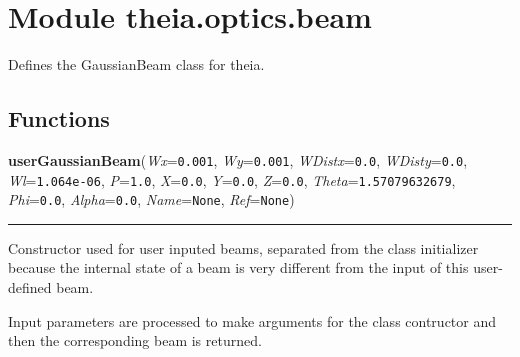 %
%
%


\section{Module theia.optics.beam}

    \label{theia:optics:beam}
Defines the GaussianBeam class for theia.



  \subsection{Functions}

    \label{theia:optics:beam:userGaussianBeam}

    \vspace{0.5ex}

\hspace{.8\funcindent}\begin{boxedminipage}{\funcwidth}

    \raggedright \textbf{userGaussianBeam}(\textit{Wx}={\tt 0.001}, \textit{Wy}={\tt 0.001}, \textit{WDistx}={\tt 0.0}, \textit{WDisty}={\tt 0.0}, \textit{Wl}={\tt 1.064e-06}, \textit{P}={\tt 1.0}, \textit{X}={\tt 0.0}, \textit{Y}={\tt 0.0}, \textit{Z}={\tt 0.0}, \textit{Theta}={\tt 1.57079632679}, \textit{Phi}={\tt 0.0}, \textit{Alpha}={\tt 0.0}, \textit{Name}={\tt None}, \textit{Ref}={\tt None})

    \vspace{-1.5ex}

    \rule{\textwidth}{0.5\fboxrule}
\setlength{\parskip}{2ex}
    Constructor used for user inputed beams, separated from the class 
    initializer because the internal state of a beam is very different from
    the input of this user-defined beam.

    Input parameters are processed to make arguments for the class 
    contructor and then the corresponding beam is returned.

\setlength{\parskip}{1ex}
    \end{boxedminipage}


